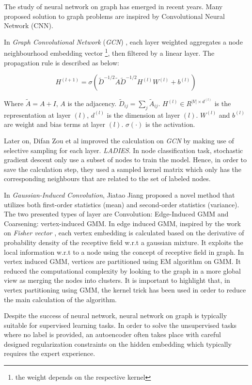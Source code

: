 The study of neural network on graph has emerged in recent years. Many proposed solution to graph problems are inspired by Convolutional Neural Network (CNN).

In \emph{Graph Convolutional Network} (\emph{GCN}) \cite{kipf2016semi}, each layer weighted aggregates a node neighbourhood embedding vector \footnote{the weight depends on the respective kernel}, then filtered by a linear layer. The propagation rule is described as below:

\begin{equation}
    H^{(l+1)} = \sigma (\widetilde{D}^{-1/2} \widetilde{A} \widetilde{D}^{-1/2} H^{(l)} W^{(l)} + b^{(l)})
\end{equation}

Where $\widetilde{A} = A + I$, $A$ is the adjacency. $\widetilde{D}_{ij} = \sum_j \widetilde{A}_{ij}$. $H^{(l)} \in R^{|V| \times d^{(l)}}$ is the representation at layer $(l)$, $d^{(l)}$ is the dimension at layer $(l)$. $W^{(l)}$ and $b^{(l)}$ are weight and bias terms at layer $(l)$. $\sigma(\cdot)$ is the activation.

Later on, Difan Zou et al \cite{zou2019layer} improved the calculation on \emph{GCN} by making use of selective sampling for each layer. \emph{LADIES}. In node classification task, stochastic gradient descent only use a subset of nodes to train the model. Hence, in order to save the calculation step, they used a sampled kernel matrix which only has the corresponding neighbours that are related to the set of labeled nodes.

In \emph{Gaussian-Induced Convolution}, Jiatao Jiang \cite{jiang2019gaussian} proposed a novel method that utilizes both first-order statistics (mean) and second-order statistics (variance). The two presented types of layer are Convolution: Edge-Induced GMM and Coarsening: vertex-induced GMM. In edge induced GMM, inspired by the work on \emph{Fisher vector} \cite{sanchez2013image}, each vertex embedding is calculated based on the derivative of probability density of the receptive field w.r.t a gaussian mixture. It exploits the local information w.r.t to a node using the concept of receptive field in graph. In vertex induced GMM, vertices are partitioned using EM algorithm on GMM. It reduced the computational complexity by looking to the graph in a more global view as merging the nodes into clusters. It is important to highlight that, in vertex partitioning using GMM, the kernel trick has been used in order to reduce the main calculation of the algorithm.

Despite the success of neural network, neural network on graph is typically suitable for supervised learning tasks. In order to solve the unsupervised tasks where no label is provided, an autoencoder often takes place with careful designed regularization constraints on the hidden embedding which typically requires the expert experience.